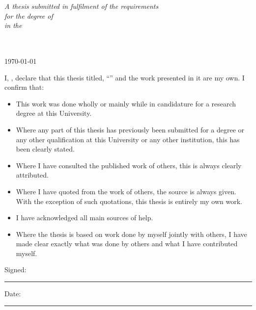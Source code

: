 \documentclass[
11pt, %
english, %
onehalfspacing, %
headsepline, %
chapterinoneline, %
]{MastersDoctoralThesis} %
\begin{document}
\begin{titlepage}
\begin{center}
\vfill

\large \textit{A thesis submitted in fulfilment of the requirements\\ for the degree of \degreename}\\[0.3cm] %
\textit{in the}\\[0.4cm]
\groupname\\\deptname\\[2cm] %
 
\vfill

{\large \today}\\[4cm] %

 
\vfill
\end{center}
\end{titlepage}


\begin{declaration}
\addchaptertocentry{\authorshipname} %
\noindent I, \authorname, declare that this thesis titled, \enquote{\ttitle} and the work presented in it are my own. I confirm that:

\begin{itemize} 
\item This work was done wholly or mainly while in candidature for a research degree at this University.
\item Where any part of this thesis has previously been submitted for a degree or any other qualification at this University or any other institution, this has been clearly stated.
\item Where I have consulted the published work of others, this is always clearly attributed.
\item Where I have quoted from the work of others, the source is always given. With the exception of such quotations, this thesis is entirely my own work.
\item I have acknowledged all main sources of help.
\item Where the thesis is based on work done by myself jointly with others, I have made clear exactly what was done by others and what I have contributed myself.\\
\end{itemize}
 
\noindent Signed:\\
\rule[0.5em]{25em}{0.5pt} %
 
\noindent Date:\\
\rule[0.5em]{25em}{0.5pt} %
\end{declaration}
\end{document}
